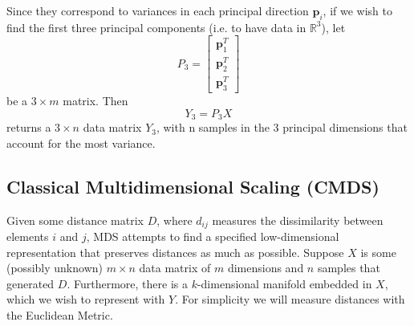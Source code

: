 \documentclass[11pt]{article}
\begin{document}
Since they correspond to variances in each principal direction $\mathbf{p}_i$, if we wish to find the first three principal components (i.e. to have data in $\mathbb{R}^3$), let
\[P_3 = \begin{bmatrix} \mathbf{p}_1^T \\[0.5em] \mathbf{p}_2^T \\[0.5em] \mathbf{p}_3^T \end{bmatrix}\]
be a $3 \times m$ matrix. Then
\[Y_3 = P_3X\]
returns a $3 \times n$ data matrix $Y_3$, with n samples in the 3 principal dimensions that account for the most variance.

\subsection*{Classical Multidimensional Scaling (CMDS)}

Given some distance matrix $D$, where $d_{ij}$ measures the dissimilarity between elements $i$ and $j$, MDS attempts to find a specified low-dimensional representation that preserves distances as much as possible. Suppose $X$ is some (possibly unknown) $m \times n$ data matrix of $m$ dimensions and $n$ samples that generated $D$. Furthermore, there is a $k$-dimensional manifold embedded in $X$, which we wish to represent with $Y$. For simplicity we will measure distances with the Euclidean Metric.
\end{document}
